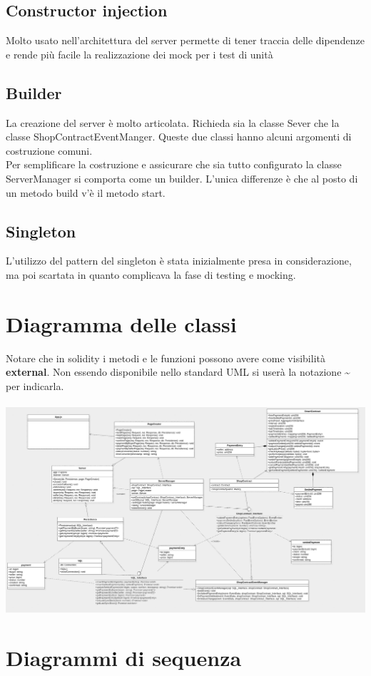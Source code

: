 \documentclass[a4paper, 12pt]{article}
\begin{document}
\subsection{Constructor injection}
Molto usato nell'architettura del server permette di tener traccia delle dipendenze e rende più facile la realizzazione dei mock per i test di unità
\subsection{Builder}
La creazione del server è molto articolata. Richieda sia la classe Sever che la classe ShopContractEventManger. Queste due classi hanno alcuni argomenti di
costruzione comuni.\\
Per semplificare la costruzione e assicurare che sia tutto configurato la classe ServerManager si comporta come un builder. L'unica differenze è che al posto
di un metodo build v'è il metodo start.
\subsection{Singleton}
L'utilizzo del pattern del singleton è stata inizialmente presa in considerazione, ma poi scartata in quanto complicava la fase di testing e mocking.
\section{Diagramma delle classi}
Notare che in solidity i metodi e le funzioni possono avere come visibilità \textbf{external}. Non essendo disponibile nello standard UML si userà la notazione \textbf{\~} per indicarla.\\\\
\includegraphics[width=1.0\textwidth]{classes}
\clearpage
\section{Diagrammi di sequenza}
\end{document}

